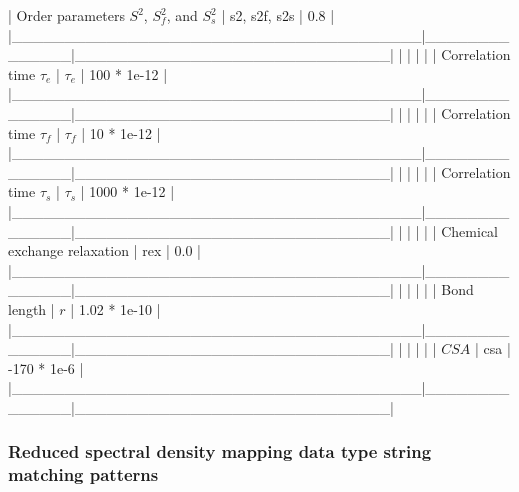 | Order parameters $S^2$, $S^2_f$, and $S^2_s$     | s2, s2f, s2s | 0.8                          |
|\_\_\_\_\_\_\_\_\_\_\_\_\_\_\_\_\_\_\_\_\_\_\_\_\_\_\_\_\_\_\_\_\_\_\_\_\_\_\_|\_\_\_\_\_\_\_\_\_\_\_\_\_\_|\_\_\_\_\_\_\_\_\_\_\_\_\_\_\_\_\_\_\_\_\_\_\_\_\_\_\_\_\_\_|
|                                       |              |                              |
| Correlation time $\tau_e$                   | $\tau_e$           | 100 * 1e-12                  |
|\_\_\_\_\_\_\_\_\_\_\_\_\_\_\_\_\_\_\_\_\_\_\_\_\_\_\_\_\_\_\_\_\_\_\_\_\_\_\_|\_\_\_\_\_\_\_\_\_\_\_\_\_\_|\_\_\_\_\_\_\_\_\_\_\_\_\_\_\_\_\_\_\_\_\_\_\_\_\_\_\_\_\_\_|
|                                       |              |                              |
| Correlation time $\tau_f$                   | $\tau_f$           | 10 * 1e-12                   |
|\_\_\_\_\_\_\_\_\_\_\_\_\_\_\_\_\_\_\_\_\_\_\_\_\_\_\_\_\_\_\_\_\_\_\_\_\_\_\_|\_\_\_\_\_\_\_\_\_\_\_\_\_\_|\_\_\_\_\_\_\_\_\_\_\_\_\_\_\_\_\_\_\_\_\_\_\_\_\_\_\_\_\_\_|
|                                       |              |                              |
| Correlation time $\tau_s$                   | $\tau_s$           | 1000 * 1e-12                 |
|\_\_\_\_\_\_\_\_\_\_\_\_\_\_\_\_\_\_\_\_\_\_\_\_\_\_\_\_\_\_\_\_\_\_\_\_\_\_\_|\_\_\_\_\_\_\_\_\_\_\_\_\_\_|\_\_\_\_\_\_\_\_\_\_\_\_\_\_\_\_\_\_\_\_\_\_\_\_\_\_\_\_\_\_|
|                                       |              |                              |
| Chemical exchange relaxation          | rex          | 0.0                          |
|\_\_\_\_\_\_\_\_\_\_\_\_\_\_\_\_\_\_\_\_\_\_\_\_\_\_\_\_\_\_\_\_\_\_\_\_\_\_\_|\_\_\_\_\_\_\_\_\_\_\_\_\_\_|\_\_\_\_\_\_\_\_\_\_\_\_\_\_\_\_\_\_\_\_\_\_\_\_\_\_\_\_\_\_|
|                                       |              |                              |
| Bond length                           | $r$            | 1.02 * 1e-10                 |
|\_\_\_\_\_\_\_\_\_\_\_\_\_\_\_\_\_\_\_\_\_\_\_\_\_\_\_\_\_\_\_\_\_\_\_\_\_\_\_|\_\_\_\_\_\_\_\_\_\_\_\_\_\_|\_\_\_\_\_\_\_\_\_\_\_\_\_\_\_\_\_\_\_\_\_\_\_\_\_\_\_\_\_\_|
|                                       |              |                              |
| $CSA$                                   | csa          | -170 * 1e-6                  |
|\_\_\_\_\_\_\_\_\_\_\_\_\_\_\_\_\_\_\_\_\_\_\_\_\_\_\_\_\_\_\_\_\_\_\_\_\_\_\_|\_\_\_\_\_\_\_\_\_\_\_\_\_\_|\_\_\_\_\_\_\_\_\_\_\_\_\_\_\_\_\_\_\_\_\_\_\_\_\_\_\_\_\_\_|




\subsubsection{Reduced spectral density mapping data type string matching patterns}



